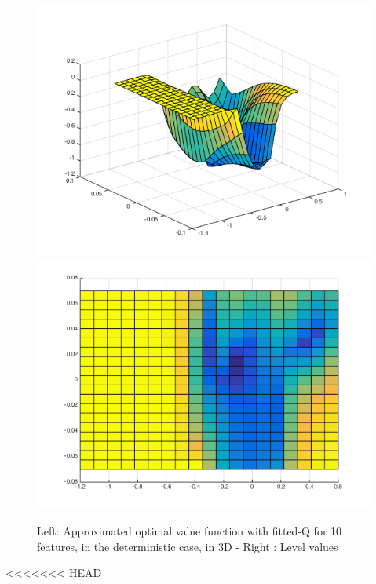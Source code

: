 \documentclass[a4paper, 12pt]{article}
\begin{document}
\begin{figure}[H]
	\centering
	\noindent\includegraphics[scale=0.3]{fittedQ-10feat-determ.png}
	\noindent\includegraphics[scale=0.3]{fittedQ-10feat-determ-flat.png}
	\caption{Left: Approximated optimal value function with fitted-Q for 10 features, in the deterministic case, in 3D - Right : Level values}
\end{figure}
<<<<<<< HEAD
\end{document}
